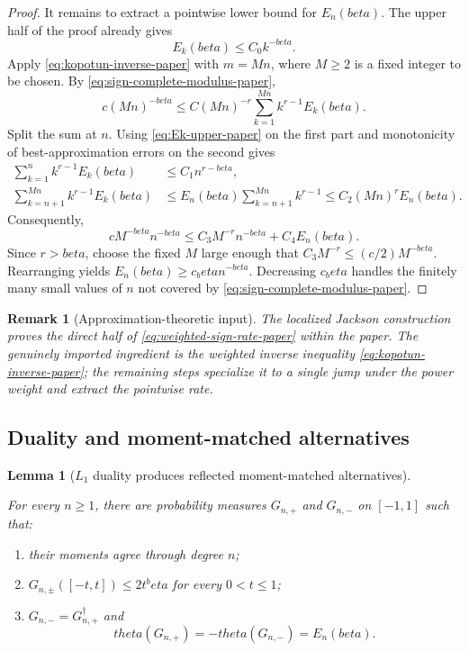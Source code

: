 \documentclass[11pt]{article}
\def\beta{beta}%
\def\theta{theta}%
\newtheorem{lemma}[theorem]{Lemma}
\newtheorem{remark}[theorem]{Remark}
\newcommand\eed[1]{{\color{green!45!black} #1}}
\begin{document}
\begin{proof}
{It remains to extract a pointwise lower bound for $E_n(\beta)$.  The upper half of the proof already gives
\begin{equation}
\label{eq:Ek-upper-paper}
E_k(\beta)\le C_0k^{-\beta}.
\end{equation}
Apply \eqref{eq:kopotun-inverse-paper} with $m=Mn$, where $M\ge2$ is a fixed integer to be chosen.  By \eqref{eq:sign-complete-modulus-paper},
\[
c(Mn)^{-\beta}
\le
C(Mn)^{-r}\sum_{k=1}^{Mn}k^{r-1}E_k(\beta).
\]
Split the sum at $n$.  Using \eqref{eq:Ek-upper-paper} on the first part and monotonicity of best-approximation errors on the second gives
\begin{align*}
\sum_{k=1}^{n}k^{r-1}E_k(\beta)
&\le C_1n^{r-\beta},\\
\sum_{k=n+1}^{Mn}k^{r-1}E_k(\beta)
&\le
E_n(\beta)\sum_{k=n+1}^{Mn}k^{r-1}
\le
C_2(Mn)^rE_n(\beta).
\end{align*}
Consequently,
\[
cM^{-\beta}n^{-\beta}
\le
C_3M^{-r}n^{-\beta}+C_4E_n(\beta).
\]
Since $r>\beta$, choose the fixed $M$ large enough that $C_3M^{-r}\le(c/2)M^{-\beta}$.  Rearranging yields $E_n(\beta)\ge c_\beta n^{-\beta}$.  Decreasing $c_\beta$ handles the finitely many small values of $n$ not covered by \eqref{eq:sign-complete-modulus-paper}.}
\end{proof}

\begin{remark}[Approximation-theoretic input]
\eed{The localized Jackson construction proves the direct half of \eqref{eq:weighted-sign-rate-paper} within the paper.  The genuinely imported ingredient is the weighted inverse inequality \eqref{eq:kopotun-inverse-paper}; the remaining steps specialize it to a single jump under the power weight and extract the pointwise rate.}
\end{remark}

\subsection{Duality and moment-matched alternatives}

\begin{lemma}[$L_1$ duality produces reflected moment-matched alternatives]
\label{lem:duality-moment-pair-paper}
\eed{For every $n\ge1$, there are probability measures $G_{n,+}$ and $G_{n,-}$ on $[-1,1]$ such that:
\begin{enumerate}[label=(\alph*)]
\item their moments agree through degree $n$;
\item $G_{n,\pm}([-t,t])\le2t^\beta$ for every $0<t\le1$;
\item $G_{n,-}=G_{n,+}^\dagger$ and
\[
\theta(G_{n,+})
=
-\theta(G_{n,-})
=
E_n(\beta).
\]
\end{enumerate}}
\end{lemma}
\end{document}

